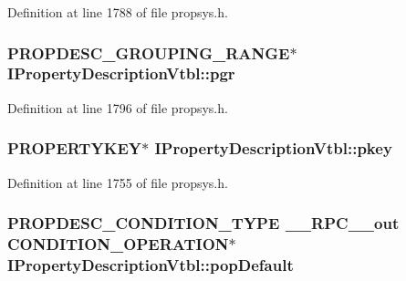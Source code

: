 Definition at line 1788 of file propsys.\+h.

\subsubsection[{\texorpdfstring{pgr}{pgr}}]{ {\bf P\+R\+O\+P\+D\+E\+S\+C\+\_\+\+G\+R\+O\+U\+P\+I\+N\+G\+\_\+\+R\+A\+N\+GE}$\ast$ I\+Property\+Description\+Vtbl\+::pgr}\hypertarget{struct_i_property_description_vtbl_a7e5471592b71a53ea8097e0778d5f04c}{}\label{struct_i_property_description_vtbl_a7e5471592b71a53ea8097e0778d5f04c}


Definition at line 1796 of file propsys.\+h.

\subsubsection[{\texorpdfstring{pkey}{pkey}}]{ {\bf P\+R\+O\+P\+E\+R\+T\+Y\+K\+EY}$\ast$ I\+Property\+Description\+Vtbl\+::pkey}\hypertarget{struct_i_property_description_vtbl_a4b32743ee8801aa5c8ee5bcdecb5c415}{}\label{struct_i_property_description_vtbl_a4b32743ee8801aa5c8ee5bcdecb5c415}


Definition at line 1755 of file propsys.\+h.

\subsubsection[{\texorpdfstring{pop\+Default}{popDefault}}]{ {\bf P\+R\+O\+P\+D\+E\+S\+C\+\_\+\+C\+O\+N\+D\+I\+T\+I\+O\+N\+\_\+\+T\+Y\+PE} {\bf \+\_\+\+\_\+\+R\+P\+C\+\_\+\+\_\+out} {\bf C\+O\+N\+D\+I\+T\+I\+O\+N\+\_\+\+O\+P\+E\+R\+A\+T\+I\+ON}$\ast$ I\+Property\+Description\+Vtbl\+::pop\+Default}\hypertarget{struct_i_property_description_vtbl_a03ec18489ce6f7a6db2edbc412b83b12}{}\label{struct_i_property_description_vtbl_a03ec18489ce6f7a6db2edbc412b83b12}


